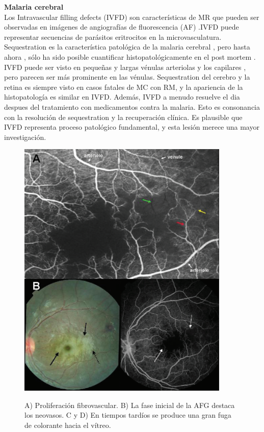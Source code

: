 \textbf{Malaria cerebral}
\\

Los Intravascular filling defects (IVFD) son características de  MR que pueden ser observadas en imágenes de  angiografías de fluorescencia (AF) .IVFD puede representar secuencias de parásitos eritrocitos en la microvasculatura. Sequestration es la característica patológica de la malaria cerebral , pero hasta ahora , sólo ha sido posible cuantificar histopatológicamente en el post mortem . IVFD puede ser visto en pequeñas y largas vénulas arteriolas y los capilares , pero parecen ser más prominente en las vénulas. Sequestration del cerebro y la retina es siempre visto en casos fatales de MC con RM, y la apariencia de la histopatología es similar en IVFD. Además, IVFD a menudo resuelve el dia despues del tratamiento con medicamentos contra la malaria. Esto es consonancia con  la resolución de sequestration y la recuperación clínica. Es plausible que  IVFD representa proceso patológico fundamental, y esta lesión merece una mayor investigación. \cite{zhao2015automated}


\begin{figure}[H]
\centering
\includegraphics[width=0.9\textwidth]{./Figures/FA_MALARIA.png}
\label{fig:lightfilter}
\caption{A) Proliferación fibrovascular. B) La fase inicial de la AFG destaca los neovasos. C y D) En tiempos tardíos se produce una gran fuga de colorante hacia el vítreo.}
\end{figure}

